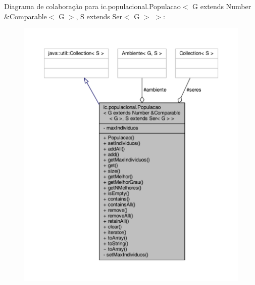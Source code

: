 Diagrama de colaboração para ic.\-populacional.\-Populacao$<$ G extends Number \&Comparable$<$ G $>$, S extends Ser$<$ G $>$ $>$\-:
\nopagebreak
\begin{figure}[H]
\begin{center}
\leavevmode
\includegraphics[width=350pt]{classic_1_1populacional_1_1_populacao_3_01_g_01extends_01_number_01_6_comparable_3_01_g_01_4_00_599b14e6302ec6435a84d6a33405323f}
\end{center}
\end{figure}
